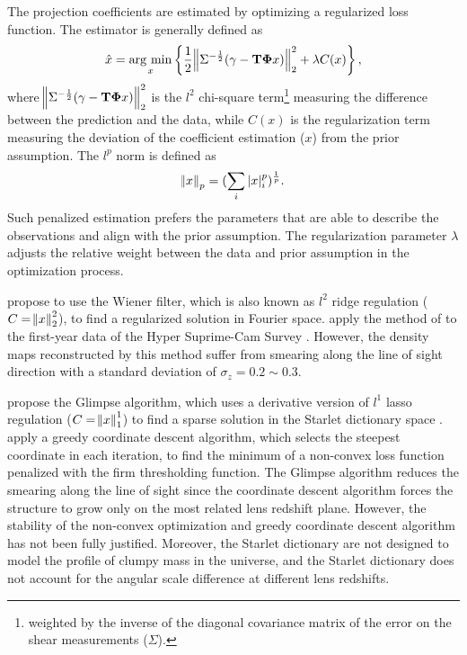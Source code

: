 \documentclass[twocolumn]{aastex63}
\newcommand{\argmin}{\mathop{\rm arg~min}\limits}
\begin{document}
The projection coefficients are estimated by optimizing a regularized loss
function. The estimator is generally defined as
\begin{equation}
\hat{x}=\argmin_{x} \left\{ \frac{1}{2}\norm{\Sigma^{-\frac{1}{2}}(\gamma-
\mathbf{T\Phi} x)}_2^2+ \lambda C(x) \right\},
\end{equation}
where $\norm{\Sigma^{-\frac{1}{2}}(\gamma - \mathbf{T\Phi} x)}_2^2$ is the
$l^2$ chi-square term\footnote{weighted by the inverse of the diagonal
covariance matrix of the error on the shear measurements ($\Sigma$).} measuring
the difference between the prediction and the data, while $C(x)$ is the
regularization term measuring the deviation of the coefficient estimation ($x$)
from the prior assumption. The $l^p$ norm is defined as
\begin{equation}
\norm{x}_p=(\sum_{i} |x|^p_i)^{\frac{1}{p}}.
\end{equation}
Such penalized estimation prefers the parameters that are able to describe the
observations and align with the prior assumption. The regularization
parameter $\lambda$ adjusts the relative weight between the data and
prior assumption in the optimization process.

\citet{LSS-massMap-Wiener-Simon2009} propose to use the Wiener filter, which is
also known as $l^2$ ridge regulation ($C=\norm{x}^2_2$), to find a regularized
solution in Fourier space. \citet{HSC1-massMaps} apply the method of
\citet{LSS-massMap-Wiener-Simon2009} to the first-year data of the Hyper
Suprime-Cam Survey \citep{HSC1-data}.  However, the density maps reconstructed
by this method suffer from smearing along the line of sight direction with a
standard deviation of $\sigma_z=0.2 \sim 0.3$.

\citet{LSS-massMap-Glimpse3D-Leonard2014} propose the Glimpse algorithm, which
uses a derivative version of $l^1$ lasso regulation ($C=\norm{x}^1_1$) to find
a sparse solution in the Starlet dictionary space \citep{Starlet-Starck2015}.
\citet{LSS-massMap-Glimpse3D-Leonard2014} apply a greedy coordinate descent
algorithm, which selects the steepest coordinate in each iteration, to find the
minimum of a non-convex loss function penalized with the firm thresholding
function. The Glimpse algorithm reduces the smearing along the line of sight
since the coordinate descent algorithm forces the structure to grow only on the
most related lens redshift plane.  However, the stability of the non-convex
optimization and greedy coordinate descent algorithm has not been fully
justified. Moreover, the Starlet dictionary are not designed to model the
profile of clumpy mass in the universe, and the Starlet dictionary does not
account for the angular scale difference at different lens redshifts.
\end{document}

